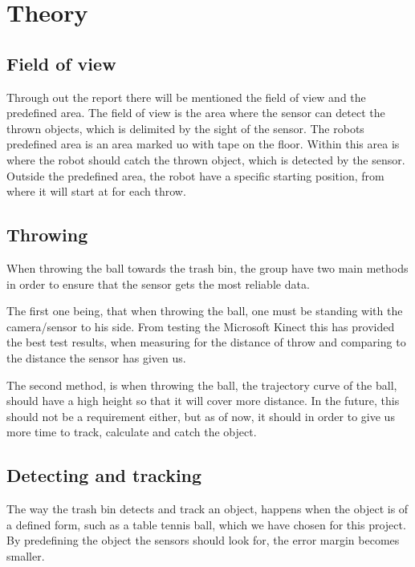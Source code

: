 \chapter{Theory}
\label{chap:Theory}

\section{Field of view}
\label{sec:Field of view}
Through out the report there will be mentioned the field of view and the predefined area. The field of view is the area where the sensor can detect the thrown objects, which is delimited by the sight of the sensor. \newline
The robots predefined area is an area marked uo with tape on the floor. Within this area is where the robot should catch the thrown object, which is detected by the sensor. Outside the predefined area, the robot have a specific starting position, from where it will start at for each throw. 

\section{Throwing}
\label{sec:ThrowingTheory}
When throwing the ball towards the trash bin, the group have two main methods in order to ensure that the sensor gets the most reliable data.

The first one being, that when throwing the ball, one must be standing with the camera/sensor to his side. From testing the Microsoft Kinect this has provided the best test results, when measuring for the distance of throw and comparing to the distance the sensor has given us.

The second method, is when throwing the ball, the trajectory curve of the ball, should have a high height so that it will cover more distance. In the future, this should not be a requirement either, but as of now, it should in order to give us more time to track, calculate and catch the object. 


\section{Detecting and tracking}
\label{sec:Detecting and trackingTheory}
The way the trash bin detects and track an object, happens when the object is of a defined form, such as a table tennis ball, which we have chosen for this project. By predefining the object the sensors should look for, the error margin becomes smaller. %


